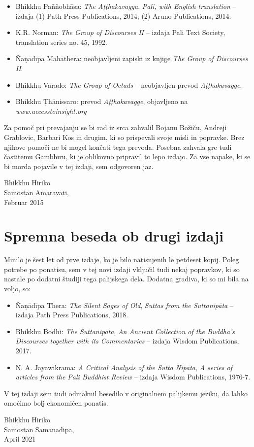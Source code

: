 \begin{itemize}
\item
  Bhikkhu Paññobhāsa: \emph{The Aṭṭhakavagga}, \emph{Pali, with English
  translation} -- izdaja (1) Path Press Publications, 2014; (2) Aruno
  Publications, 2014.
\item
  K.R. Norman: \emph{The Group of Discourses II} -- izdaja Pali Text
  Society, translation series no. 45, 1992.
\item
  Ñaṇādīpa Mahāthera: neobjavljeni zapiski iz knjige \emph{The Group of
  Discourses II}.
\item
  Bhikkhu Varado: \emph{The Group of Octads} -- neobjavljen prevod
  \emph{Aṭṭhakavagge}.
\item
  Bhikkhu Ṭhānissaro: prevod \emph{Aṭṭhakavagge}, objavljeno na \emph{www.accesstoinsight.org}
\end{itemize}

Za pomoč pri prevajanju se bi rad iz srca zahvalil Bojanu Božiču,
Andreji Grablovic, Barbari Kos in drugim, ki so prispevali svoje misli
in popravke. Brez njihove pomoči ne bi mogel končati tega prevoda.
Posebna zahvala gre tudi častitemu Gambhīru, ki je oblikovno pripravil
to lepo izdajo. Za vse napake, ki se bi morda pojavile v tej izdaji, sem
odgovoren jaz.

\bigskip

{\raggedleft
Bhikkhu Hiriko\\
Samostan Amaravati,\\
Februar 2015
\par}

\section{Spremna beseda ob drugi izdaji}

Minilo je šest let od prve izdaje, ko je bilo natisnjenih le petdeset 
kopij. Poleg potrebe po ponatisu, sem v tej novi izdaji vključil tudi 
nekaj popravkov, ki so nastale po dodatni študiji tega palijskega dela.
Dodatna gradiva, ki so mi bila na voljo, so:

\begin{itemize}
\item
  Ñaṇādīpa Thera: \emph{The Silent Sages of Old}, \emph{Suttas from the Suttanipāta} -- izdaja Path Press Publications, 2018.
\item
  Bhikkhu Bodhi: \emph{The Suttanipāta}, \emph{An Ancient Collection of the Buddha's Discourses together with its Commentaries} -- izdaja Wisdom Publications, 2017.
\item
  N. A. Jayawikrama: \emph{A Critical Analysis of the Sutta Nipāta}, \emph{A series of articles from the Pali Buddhist Review} -- izdaja Wisdom Publications, 1976-7.
\end{itemize}

V tej izdaji sem tudi odmaknil besedilo v originalnem palijkemu jeziku,
da lahko omočimo bolj ekonomičen ponatis.
\bigskip

{\raggedleft
Bhikkhu Hiriko\\
Samostan Samanadipa,\\
April 2021
\par}

